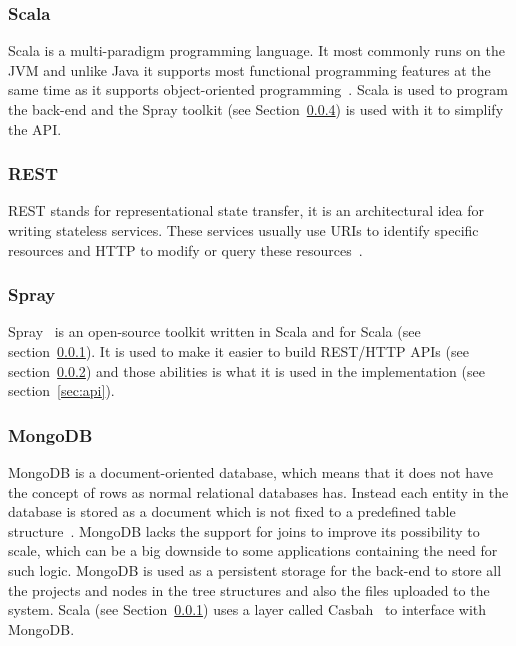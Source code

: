 \documentclass[a4paper,12pt]{article}
\begin{document}
\subsubsection{Scala} \label{sec:scala}
Scala is a multi-paradigm programming language. It most commonly runs on the JVM and unlike
Java it supports most functional programming features at the same time as it supports 
object-oriented programming~\cite{SCALA}. Scala is used to program the back-end and the Spray
toolkit (see Section~\ref{sec:spray}) is used with it to simplify the API.

\subsubsection{REST} \label{sec:rest}
REST stands for representational state transfer, it is an architectural idea for writing stateless
services. These services usually use URIs to identify specific resources and HTTP to modify or query
these resources~\cite{REST}. 

\subsubsection{Spray} \label{sec:spray}
Spray~\cite{CASBAH} is an open-source toolkit written in Scala and for Scala (see
section~\ref{sec:scala}). It is used to make it easier to build REST/HTTP APIs (see
section~\ref{sec:rest}) and those abilities is what it is used in the implementation (see
section~\ref{sec:api}).

\subsubsection{MongoDB} \label{sec:spray}
MongoDB is a document-oriented database, which means that it does not have the concept of rows as
normal relational databases has. Instead each entity in the database is stored as a document which
is not fixed to a predefined table structure~\cite{MONGODB}. MongoDB lacks the support for joins to
improve its possibility to scale, which can be a big downside to some applications containing the
need for such logic. MongoDB is used as a persistent storage for the back-end to store all the
projects and nodes in the tree structures and also the files uploaded to the system. Scala (see
Section~\ref{sec:scala}) uses a layer called Casbah~\cite{CASBAH} to interface with MongoDB.
\end{document}
